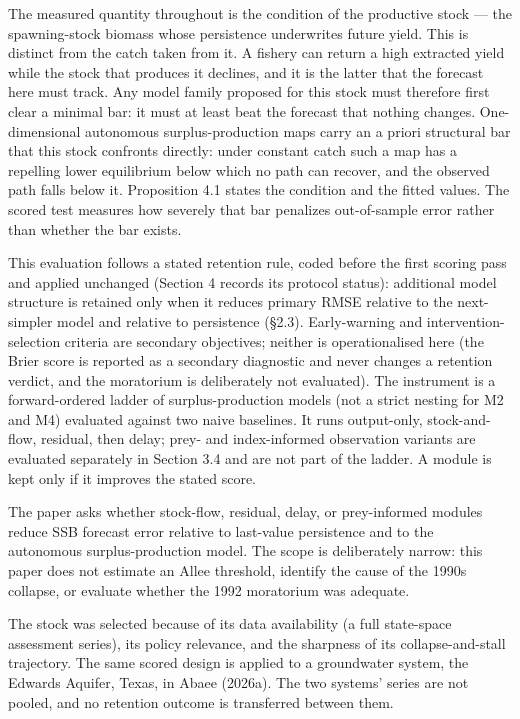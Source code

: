 \documentclass[11pt]{article}
\begin{document}
The measured quantity throughout is the condition of the productive
stock --- the spawning-stock biomass whose persistence underwrites
future yield. This is distinct from the catch taken from it. A fishery
can return a high extracted yield while the stock that produces it
declines, and it is the latter that the forecast here must track. Any
model family proposed for this stock must therefore first clear a
minimal bar: it must at least beat the forecast that nothing changes.
One-dimensional autonomous surplus-production maps carry an a priori
structural bar that this stock confronts directly: under constant catch
such a map has a repelling lower equilibrium below which no path can
recover, and the observed path falls below it. Proposition 4.1 states
the condition and the fitted values. The scored test measures how
severely that bar penalizes out-of-sample error rather than whether the
bar exists.

This evaluation follows a stated retention rule, coded before the first
scoring pass and applied unchanged (Section 4 records its protocol
status): additional model structure is retained only when it reduces
primary RMSE relative to the next-simpler model and relative to
persistence (\S{}2.3). Early-warning and intervention-selection criteria
are secondary objectives; neither is operationalised here (the
Brier score is reported as a secondary diagnostic and never changes a
retention verdict, and the moratorium is deliberately not evaluated).
The instrument is a forward-ordered ladder of surplus-production models
(not a strict nesting for M2 and M4) evaluated against two naive
baselines. It runs output-only, stock-and-flow, residual, then delay;
prey- and index-informed observation variants are evaluated separately
in Section 3.4 and are not part of the ladder. A module is kept only if
it improves the stated score.

The paper asks whether stock-flow, residual, delay, or prey-informed
modules reduce SSB forecast error relative to last-value persistence and
to the autonomous surplus-production model. The scope is deliberately
narrow: this paper does not estimate an Allee threshold, identify the
cause of the 1990s collapse, or evaluate whether the 1992 moratorium was
adequate.

The stock was selected because of its data availability (a full
state-space assessment series), its policy relevance, and the sharpness
of its collapse-and-stall trajectory. The same scored design is applied to a groundwater system, the Edwards
Aquifer, Texas, in Abaee (2026a). The two systems' series are not
pooled, and no retention outcome is transferred between them.
\end{document}
